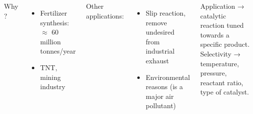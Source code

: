 \begin{frame}
\begin{columns}
            \medskip
            \pause
            Why \nitricacid ?
            \begin{itemize}
                \pause
                \item Fertilizer synthesis: $\approx$ 60 million tonnes/year
                \pause
                \item TNT, mining industry
            \end{itemize}            

            \medskip
            \pause
            Other applications:
            \begin{itemize}
                \item Slip reaction, remove undesired \ammonia from industrial exhaust
                \pause
                \item Environmental reasons (\ammonia is a major air pollutant)
            \end{itemize}
            
            \medskip
            \color{Important}
                \pause
                Application → catalytic reaction tuned towards a specific product.\\
                \pause
                Selectivity → temperature, pressure, reactant ratio, type of catalyst.

            
    \end{columns}    
\end{frame}